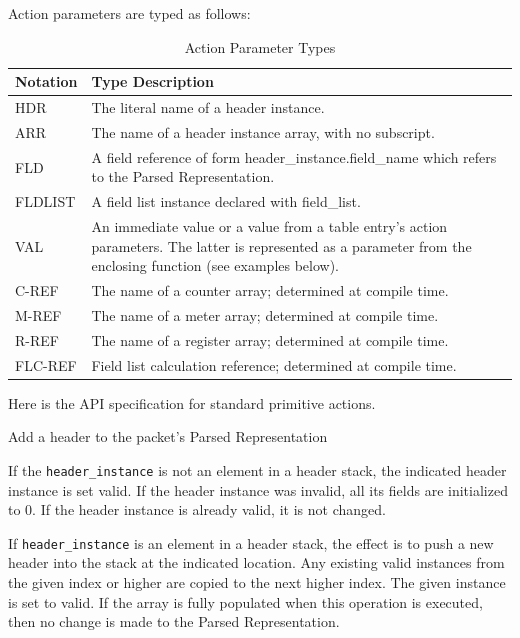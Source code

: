 \documentclass[12pt]{article}
\begin{document}
Action parameters are typed as follows:

\begin{table}[H]
\begin{center}
\begin{tabular}{| l | p{} |} \hline
\textbf{Notation} &
\textbf{Type Description} \\ \hline
HDR &
The literal name of a header instance. \\ \hline
ARR &
The name of a header instance array, with no subscript. \\ \hline
FLD &
A field reference of form header_instance.field_name which refers to the Parsed Representation. \\ \hline
FLDLIST &
A field list instance declared with field_list. \\ \hline
VAL &
An immediate value or a value from a table entry's action parameters. The latter is represented as a parameter from the enclosing function (see examples below). \\ \hline
C-REF &
The name of a counter array; determined at compile time. \\ \hline
M-REF &
The name of a meter array; determined at compile time. \\ \hline
R-REF &
The name of a register array; determined at compile time. \\ \hline
FLC-REF &
Field list calculation reference; determined at compile time. \\ \hline
\end{tabular}
\end{center}
\caption{Action Parameter Types}
\label{tab:actionparamtypes}
\end{table}


Here is the API specification for standard primitive actions.


{ %
Add a header to the packet's Parsed Representation
}
{ %
}
{ %
If the \texttt{header_instance} is not an element in a header stack, the indicated 
header instance is set valid. If the header instance was invalid, all its 
fields are initialized to 0. If the header instance is already valid, it is 
not changed.

If \texttt{header_instance} is an element in a header stack, the effect is to push 
a new header into the stack at the indicated location. Any existing valid 
instances from the given index or higher are copied to the next higher index. 
The given instance is set to valid. If the array is fully populated when this 
operation is executed, then no change is made to the Parsed Representation.
}
\end{document}
